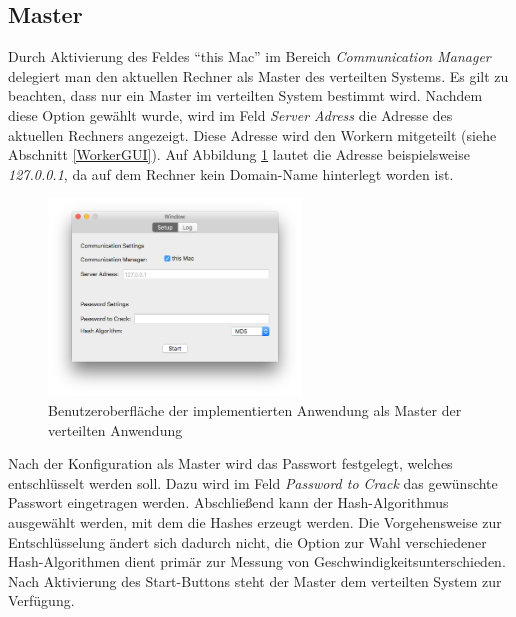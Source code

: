 \subsection{Master}
Durch Aktivierung des Feldes \enquote{this Mac} im Bereich \emph{Communication Manager} delegiert man den aktuellen Rechner als Master des verteilten Systems. Es gilt zu beachten, dass nur ein Master im verteilten System bestimmt wird. Nachdem diese Option gewählt wurde, wird im Feld \emph{Server Adress} die Adresse des aktuellen Rechners angezeigt. Diese Adresse wird den Workern mitgeteilt (siehe Abschnitt \ref{WorkerGUI}). Auf Abbildung \ref{fig:WindowMaster} lautet die Adresse beispielsweise \emph{127.0.0.1}, da auf dem Rechner kein Domain-Name hinterlegt worden ist. \\
\begin{figure}[!ht]
	\centering
		\includegraphics[natwidth=1200pt, natheight=349pt, width=0.6\textwidth]{images/WindowMaster.png}
		\caption{Benutzeroberfläche der implementierten Anwendung als Master der verteilten Anwendung}
	\label{fig:WindowMaster}
\end{figure}
Nach der Konfiguration als Master wird das Passwort festgelegt, welches entschlüsselt werden soll. Dazu wird im Feld \emph{Password to Crack} das gewünschte Passwort eingetragen werden. Abschließend kann der Hash-Algorithmus ausgewählt werden, mit dem die Hashes erzeugt werden. Die Vorgehensweise zur Entschlüsselung ändert sich dadurch nicht, die Option zur Wahl verschiedener Hash-Algorithmen dient primär zur Messung von Geschwindigkeitsunterschieden. \\

Nach Aktivierung des Start-Buttons steht der Master dem verteilten System zur Verfügung.   


